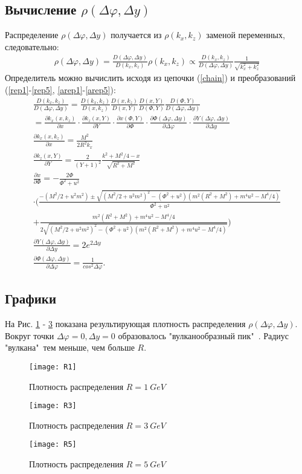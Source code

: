 \documentclass[12pt]{article}
\renewcommand{\phi}{\varphi}
\newcommand{\pd}{\partial}
\def\Dphi{\Delta\phi}
\def\Dy{\Delta y}
\def\kx{k_x}
\def\kxx{k_x^2}
\def\kz{k_z}
\def\kzz{k_z^2}
\def\f{\Phi}
\def\y{Y}
\def\d#1#2{\frac{\partial #1}{\partial #2}}
\def\dff#1#2#3#4{\frac{\partial #1 \left( #2 \right)}{\partial #3}}
\def\det#1#2{\frac{D \left( #1 \right)}{D \left( #2 \right)}}
\def\pa{\kx, \kz}
\def\pb{x, \kz}
\def\pc{x, Y}
\def\pd{\f, Y}
\def\pe{\Dphi, \Dy}
\begin{document}
\subsection{Вычисление $\rho(\Dphi, \Dy)$}
\qquad Распределение $\rho(\Dphi, \Dy)$ получается из $\rho(\kx, \kz)$ заменой переменных, следовательно:
\begin{gather}
\rho(\Dphi, \Dy) = \det{\Dphi, \Dy}{\kx,\kz} \rho(\kx, \kz) \propto \det{\kx,\kz}{\Dphi, \Dy} \frac{1}{\sqrt{\kxx + \kzz}}
\end{gather}
Определитель можно вычислить исходя из цепочки (\ref{chain}) и преобразований (\ref{rep1}-\ref{rep5}, \ref{arep1}-\ref{arep5}):
\begin{gather}
\det{\pa}{\pe} = \det{\pa}{\pb}\det{\pb}{\pc}\det{\pc}{\pd}\det{\pd}{\pe} \\
= \dff{\kx}{\pb}{x}{\kz} \cdot \dff{\kz}{\pc}{Y}{x} \cdot \dff{x}{\pd}{\f}{Y} \cdot \dff{\f}{\pe}{\Dphi}{\Dy} \cdot \dff{Y}{\pe}{\Dy}{\Dphi} \\
\dff{\kx}{\pb}{x}{} = \frac{M^2}{2 R^2 \kx} \\
\dff{\kz}{\pc}{Y}{x} = \frac{2}{(\y + 1)^2}\frac{k^2 + M^2 / 4 - x}{\sqrt{R^2 + M^2}} \\
\d{x}{\f} =  -\frac{2 \f}{\f^2 + u^2} \nonumber \\
\cdot \Big( \frac{-(M^2 / 2 + u^2 m^2) \pm \sqrt{(M^2 / 2 + u^2 m^2)^2 - (\f^2 + u^2)(m^2(R^2 + M^2) + m^4 u^2 - M^4 / 4)}}{\f^2 + u^2} \nonumber \\
+ \frac{m^2(R^2 + M^2) + m^4 u^2 - M^4 / 4}{2\sqrt{(M^2 / 2 + u^2 m^2)^2 - (\f^2 + u^2)(m^2(R^2 + M^2) + m^4 u^2 - M^4 / 4)}} \Big) \\
\dff{Y}{\pe}{\Dy}{} = 2 e^{2\Dy} \\
\dff{\f}{\pe}{\Dphi}{} = \frac{1}{ cos^2 \Dphi}.
\end{gather}

\subsection{Графики}
\qquad На Рис. \ref{r1} - \ref{r5} показана результирующая плотность распределения $\rho(\Dphi, \Dy)$. Вокруг точки $\Dphi = 0, \Dy = 0$ образовалось "вулканообразный пик"\ . Радиус "вулкана"\ тем меньше, чем больше $R$.
\begin{figure}
	\texttt{[image: R1]}
	\caption{Плотность распределения $R = 1\ GeV$}
	\label{r1}
\end{figure}
\begin{figure}
	\texttt{[image: R3]}
	\caption{Плотность распределения $R = 3\ GeV$}
	\label{r3}
\end{figure}
\begin{figure}
	\texttt{[image: R5]}
	\caption{Плотность распределения $R = 5\ GeV$}
	\label{r5}
\end{figure}
\end{document}
